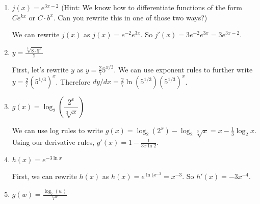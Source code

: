 \documentclass{article}
\begin{document}
\begin{enumerate}[resume]
\begin{enumerate}
  \item
    \begin{problem}[\vfill\newpage]
      $j(x) = e^{3x - 2}$ (Hint: We know how to differentiate functions of the form $C e^{kx}$ or $C \cdot b^x$. Can you rewrite this in one of those two ways?) 
    \end{problem}

    \begin{solution}
      We can rewrite $j(x)$ as $j(x)=e^{-2}e^{3x}$. So
      $j'(x)=3e^{-2}e^{3x}=\boxed{3e^{3x-2}}$.
    \end{solution}

  \item
    \begin{problem}[\vfill]
      $\displaystyle y = \frac{\sqrt[3]{8 \cdot 5^x}}{7}$
    \end{problem}

    \begin{solution}
      First, let's rewrite $y$ as $y=\tfrac{2}{7} 5^{x/3}$. We
      can use exponent rules to further write $y=\tfrac{2}{7} (5^{1/3})^x$.
      Therefore $dy/dx = \boxed{\tfrac{2}{7} \ln(5^{1/3}) (5^{1/3})^x}$.
    \end{solution}

  \item
    \begin{problem}[\vfill]
      $g(x) = \log_2 \left( \dfrac{2^x}{\sqrt[3]{x}} \right)$
    \end{problem}

    \begin{solution}
      We can use log rules to write 
      $g(x) = \log_2 (2^x) - \log_2 \sqrt[3]{x} 
      = x - \tfrac{1}{3} \log_2 x$. Using our derivative rules,
      $g'(x) = \boxed{1-\frac{1}{3x\ln2}}$.
    \end{solution}

  \item
    \begin{problem}[\vfill]
      $h(x) = e^{-3 \ln x}$
    \end{problem}

    \begin{solution}
      First, we can rewrite $h(x)$ as $h(x) = e^{\ln(x^{-3}}=x^{-3}$.
      So $h'(x) = \boxed{-3x^{-4}}$.
    \end{solution}

  \item

    \begin{problem}[\vfill\newpage]
      $\displaystyle g(w) = \frac{\log_7(w)}{7^w}$
    \end{problem}


\end{enumerate}
\end{enumerate}
\end{document}
